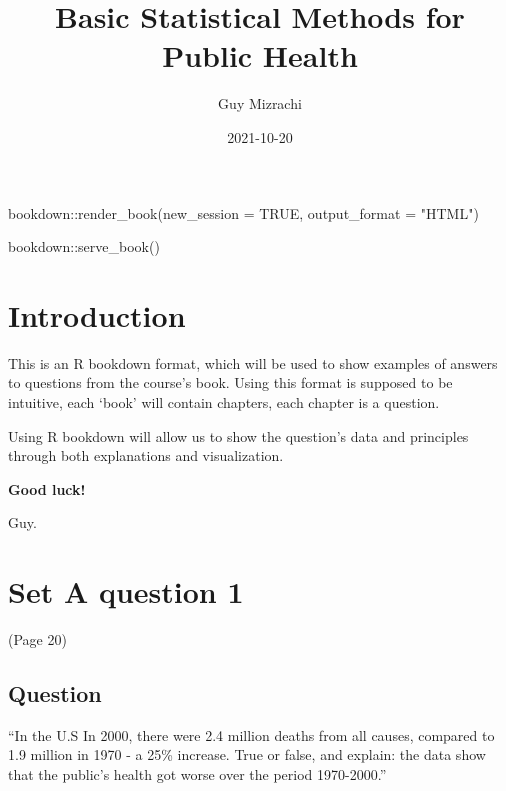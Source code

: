\documentclass[
]{book}
\title{Basic Statistical Methods for Public Health}
\author{Guy Mizrachi}
\date{2021-10-20}
\newenvironment{Shaded}{\begin{snugshade}}{\end{snugshade}}
\newcommand{\AttributeTok}[1]{\textcolor[rgb]{0.77,0.63,0.00}{#1}}
\newcommand{\ConstantTok}[1]{\textcolor[rgb]{0.00,0.00,0.00}{#1}}
\newcommand{\FunctionTok}[1]{\textcolor[rgb]{0.00,0.00,0.00}{#1}}
\newcommand{\NormalTok}[1]{#1}
\newcommand{\SpecialCharTok}[1]{\textcolor[rgb]{0.00,0.00,0.00}{#1}}
\newcommand{\StringTok}[1]{\textcolor[rgb]{0.31,0.60,0.02}{#1}}
\begin{document}
\maketitle

{
\setcounter{tocdepth}{1}
\tableofcontents
}
\begin{Shaded}
\begin{Highlighting}[]
\NormalTok{bookdown}\SpecialCharTok{::}\FunctionTok{render\_book}\NormalTok{(}\AttributeTok{new\_session =} \ConstantTok{TRUE}\NormalTok{, }\AttributeTok{output\_format =} \StringTok{"HTML"}\NormalTok{)}
\end{Highlighting}
\end{Shaded}

\begin{Shaded}
\begin{Highlighting}[]
\NormalTok{bookdown}\SpecialCharTok{::}\FunctionTok{serve\_book}\NormalTok{()}
\end{Highlighting}
\end{Shaded}

\hypertarget{introduction}{%
\chapter{Introduction}\label{introduction}}

This is an R bookdown format, which will be used to show examples of answers to questions from the course's book.
Using this format is supposed to be intuitive, each `book' will contain chapters, each chapter is a question.

Using R bookdown will allow us to show the question's data and principles through both explanations and visualization.

\textbf{Good luck!}

Guy.

\hypertarget{set-a-question-1}{%
\chapter{Set A question 1}\label{set-a-question-1}}

(Page 20)

\hypertarget{question}{%
\section{Question}\label{question}}

``In the U.S In 2000, there were 2.4 million deaths from all causes, compared to 1.9 million in 1970 - a 25\% increase.
True or false, and explain: the data show that the public's health got worse over the period 1970-2000.''
\end{document}
